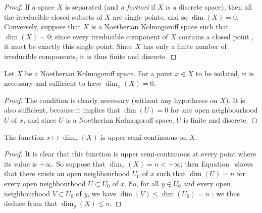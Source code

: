 \begin{proof}
\label{proof-0.14.1.9}
If a space $X$ is separated (and \emph{a fortiori} if $X$ is a discrete space), then all the irreducible closed subsets of $X$ are single points, and so $\dim(X)=0$.
Conversely, suppose that $X$ is a Noetherian Kolmogoroff space such that $\dim(X)=0$;
since every irreducible component of $X$ contains a closed point , it must be exactly this single point.
Since $X$ has only a finite number of irreducible components, it is thus finite and discrete.
\end{proof}

\begin{cor}[14.1.10]
\label{0.14.1.10}
Let $X$ be a Noetherian Kolmogoroff space.
For a point $x\in X$ to be isolated, it is necessary and sufficient to have $\dim_x(X)=0$.
\end{cor}

\begin{proof}
\label{proof-0.14.1.10}
The condition is clearly necessary (without any hypotheses on $X$).
It is also sufficient,
because it implies that $\dim(U)=0$ for any open neighbourhood $U$ of $x$, and since $U$ is a Noetherian Kolmogoroff space, $U$ is finite and discrete.
\end{proof}

\begin{prop}[14.1.11]
\label{0.14.1.11}
The function $x\mapsto\dim_x(X)$ is upper semi-continuous on $X$.
\end{prop}

\begin{proof}
\label{proof-0.14.1.11}
It is clear that this function is upper semi-continuous at every point where its value is $+\infty$.
So suppose that $\dim_x(X)=n<+\infty$;
then Equation~ shows that there exists an open neighbourhood $U_0$ of $x$ such that $\dim(U)=n$ for every open neighbourhood $U\subset U_0$ of $x$.
So, for all $y\in U_0$ and every open neighbourhood $V\subset U_0$ of $y$, we have $\dim(V)\leq\dim(U_0)=n$ ;
we thus deduce from  that $\dim_y(X)\leq n$.
\end{proof}

